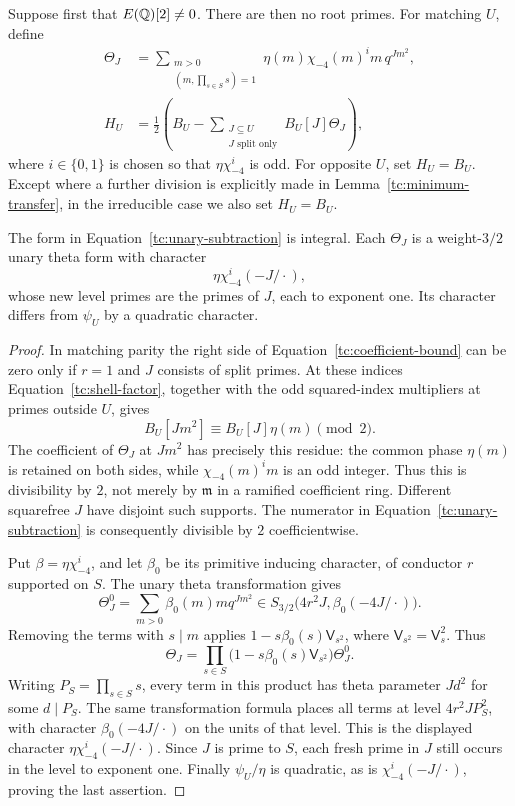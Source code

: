 Suppose first that $E(\mathbb Q)[2]\ne0$.  There are then no root primes.
For matching $U$, define
\begin{equation}
 \begin{split}
 \Theta_J&=
    \sum_{\substack{m>0\\(m,\prod_{s\in S}s)=1}}
       \eta(m)\chi_{-4}(m)^i m\,q^{Jm^2},\\
 H_U&=\frac12\left(B_U-
       \sum_{\substack{J\subseteq U\\J\text{ split only}}}
                    B_U[J]\Theta_J\right),
 \end{split}
 \label{tc:unary-subtraction}
\end{equation}
where $i\in\{0,1\}$ is chosen so that $\eta\chi_{-4}^i$ is odd.
For opposite $U$, set $H_U=B_U$.  Except where a further division is
explicitly made in Lemma~\ref{tc:minimum-transfer}, in the irreducible
case we also set $H_U=B_U$.

\begin{lemma}
\label{tc:unary-integrality}
The form in Equation~\eqref{tc:unary-subtraction} is integral.  Each
$\Theta_J$ is a weight-$3/2$ unary theta form with character
\[
                \eta\chi_{-4}^i(-J/\cdot),
\]
whose new level primes are the primes of $J$, each to exponent one.
Its character differs from $\psi_U$ by a quadratic character.
\end{lemma}

\begin{proof}
In matching parity the right side of
Equation~\eqref{tc:coefficient-bound} can be zero only if $r=1$ and
$J$ consists of split primes.  At these indices
Equation~\eqref{tc:shell-factor}, together with the odd squared-index
multipliers at primes outside $U$, gives
\[
                  B_U[Jm^2]\equiv B_U[J]\eta(m)\pmod2.
\]
The coefficient of $\Theta_J$ at $Jm^2$ has precisely this residue:
the common phase $\eta(m)$ is retained on both sides, while
$\chi_{-4}(m)^i m$ is an odd integer.  Thus this is divisibility by
$2$, not merely by $\mathfrak m$ in a ramified coefficient ring.
Different squarefree $J$ have disjoint such supports.  The numerator in
Equation~\eqref{tc:unary-subtraction} is consequently divisible by $2$
coefficientwise.

Put $\beta=\eta\chi_{-4}^i$, and let $\beta_0$ be its primitive
inducing character, of conductor $r$ supported on $S$.  The unary
theta transformation \citep[Section~2, p.~2]{Purkait2012} gives
\[
 \Theta_J^0=\sum_{m>0}\beta_0(m)m q^{Jm^2}
 \in S_{3/2}\bigl(4r^2J,\beta_0(-4J/\cdot)\bigr).
\]
Removing the terms with $s\mid m$ applies
$1-s\beta_0(s)\mathsf V_{s^2}$, where
$\mathsf V_{s^2}=\mathsf V_s^2$.  Thus
\[
 \Theta_J=\prod_{s\in S}
       \bigl(1-s\beta_0(s)\mathsf V_{s^2}\bigr)\Theta_J^0.
\]
Writing $P_S=\prod_{s\in S}s$, every term in this product has theta
parameter $Jd^2$ for some $d\mid P_S$.  The same transformation formula
places all terms at level $4r^2JP_S^2$, with character
$\beta_0(-4J/\cdot)$ on the units of that level.  This is the displayed
character $\eta\chi_{-4}^i(-J/\cdot)$.  Since $J$ is prime to $S$,
each fresh prime in $J$ still occurs in the level to exponent one.
Finally $\psi_U/\eta$ is quadratic, as is
$\chi_{-4}^i(-J/\cdot)$, proving the last assertion.
\end{proof}


